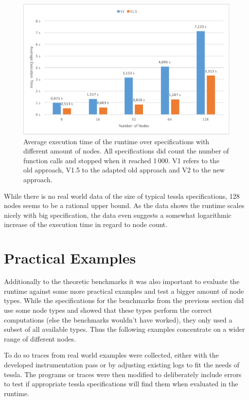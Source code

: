 \begin{figure}
  \includegraphics[angle=90,origin=c,width=\textwidth]{gfx/runtime_num_nodes_benchmark}
  \caption[Average execution time of the runtime over specifications with different amount of nodes.]{Average execution time of the runtime over specifications with different amount of nodes. All specifications did count the number of function calls and stopped when it reached 1\,000. V1 refers to the old approach, V1.5 to the adapted old approach and V2 to the new approach.}
\label{fig:chap_eval:runtime_num_nodes}
\end{figure}

While there is no real world data of the size of typical \gls{tessla} specifications, 128 nodes seems to be a rational upper bound.
As the data shows the runtime scales nicely with big specification, the data even suggests a somewhat logarithmic increase of the execution time in regard to node count.

\section{Practical Examples}
\label{sec:evaluation:runtime_examples}

Additionally to the theoretic benchmarks it was also important to evaluate the runtime against some more practical examples and test a bigger amount of node types.
While the specifications for the benchmarks from the previous section did use some node types and showed that these types perform the correct computations (else the benchmarks wouldn't have worked), they only used a subset of all available types.
Thus the following examples concentrate on a wider range of different nodes.

To do so traces from real world examples were collected, either with the developed instrumentation pass or by adjusting existing logs to fit the needs of \gls{tessla}.
The programs or traces were then modified to deliberately include errors to test if appropriate \gls{tessla} specifications will find them when evaluated in the runtime.

